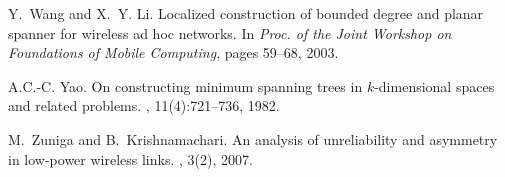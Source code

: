 \documentclass{llncs}
\begin{document}
\begin{thebibliography}{10}
Y.~Wang and X.~Y. Li.
\newblock Localized construction of bounded degree and planar spanner for
  wireless ad hoc networks.
\newblock In {\em Proc. of the Joint Workshop on Foundations of Mobile
  Computing}, pages 59--68, 2003.

A.C.-C. Yao.
\newblock On constructing minimum spanning trees in $k$-dimensional spaces and
  related problems.
, 11(4):721--736, 1982.

M.~Zuniga and B.~Krishnamachari.
\newblock An analysis of unreliability and asymmetry in low-power wireless
  links.
, 3(2), 2007.

\end{thebibliography}
\end{document}

